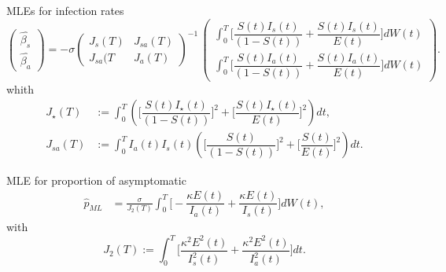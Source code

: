 \begin{frame}{MLEs for infection rates }
        \begin{equation*}
            \begin{pmatrix}
                 \hat{\beta_s}  
                 \\
                 \hat{\beta_a} 
            \end{pmatrix}
        =
            - \sigma 
        \begin{pmatrix}
            J_s(T) & J_{sa}(T)\\
            J_{sa}(T & J_a(T)
        \end{pmatrix}^{-1} \, 
        \begin{pmatrix}
            \int_0^T 
                \Big[ 
                    \dfrac{S(t) I_s(t)}{ (1-S(t))} 
                    + \dfrac{S(t) I_s(t)}{ E(t)} 
                \Big] 
             dW(t) 
         \\
         \int_0^T 
             \Big[
                 \dfrac{S(t) I_a(t)}{ (1-S(t))}
                 + \dfrac{S(t) I_a(t)}{ E(t)} 
             \Big]  dW(t)
        \end{pmatrix}.
    \end{equation*}
    whith
    \begin{align*}
        J_\star(T)
            &:= 
                \int_0^T 
                    \left(
                        \Big[
                            \dfrac{S(t) I_\star(t)}{ (1-S(t))} 
                        \Big]^2  
                        +
                        \Big[ 
                            \dfrac{S(t) I_\star(t)}{ E(t)}
                        \Big]^2 
                    \right) dt,
        \\
        J_{sa}(T)
            &:=  
                \int_0^T 
                    I_a(t) I_s(t) 
                    \left(
                        \Big[
                            \dfrac{S(t)}{(1-S(t))}
                        \Big] ^ 2  
                        +
                        \Big[
                            \dfrac{S(t)}{E(t)} 
                        \Big] ^ 2 
                    \right) dt.
    \end{align*}
\end{frame}
%
\begin{frame}{MLE for proportion of asymptomatic }
    \begin{align*}
         \label{MLE_p}
         \hat{p}_{ML}&=
             \frac{\sigma }{J_2(T)} 
                 \int_0^T 
                     \Big[
                         - \dfrac{\kappa E(t)}{ I_a(t)} 
                         + \dfrac{\kappa E(t)}{ I_s(t)} 
                     \Big] dW(t),
    \end{align*}
 with 
$$
    J_2(T):=
        \int_0^T
            \Big[
                \dfrac{\kappa ^ 2 E ^ 2(t)}{I_s^2(t)} 
                + \dfrac{\kappa ^ 2 E ^ 2(t)}{ I_a^2(t)}
            \Big] dt.
$$
\end{frame}


